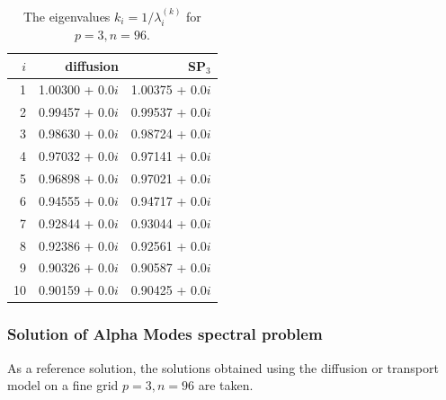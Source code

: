 \documentclass[authoryear]{elsarticle}
\begin{document}
\begin{table}[H]
\caption{The eigenvalues $k_i=1/\lambda_i^{(k)}$ for $p=3, n=96$.}
\label{tab:iaea_cosym_lambda_10}
\begin{center}
\begin{tabular}{rrr}
\hline
$i$ & diffusion & SP$_3$  \\
\hline
1 & 1.00300 + 0.0$i$ & 1.00375 + 0.0$i$\\
2 & 0.99457 + 0.0$i$ & 0.99537 + 0.0$i$\\
3 & 0.98630 + 0.0$i$ & 0.98724 + 0.0$i$\\
4 & 0.97032 + 0.0$i$ & 0.97141 + 0.0$i$\\
5 & 0.96898 + 0.0$i$ & 0.97021 + 0.0$i$\\
6 & 0.94555 + 0.0$i$ & 0.94717 + 0.0$i$\\
7 & 0.92844 + 0.0$i$ & 0.93044 + 0.0$i$\\
8 & 0.92386 + 0.0$i$ & 0.92561 + 0.0$i$\\
9 & 0.90326 + 0.0$i$ & 0.90587 + 0.0$i$\\
10 & 0.90159 + 0.0$i$ & 0.90425 + 0.0$i$\\
\hline
\end{tabular}
\end{center}
\end{table}

\subsubsection{Solution of Alpha Modes spectral problem}
As a reference solution, the solutions obtained using the diffusion or transport model on a fine grid $ p = 3, n = 96 $ are taken.
\end{document}

